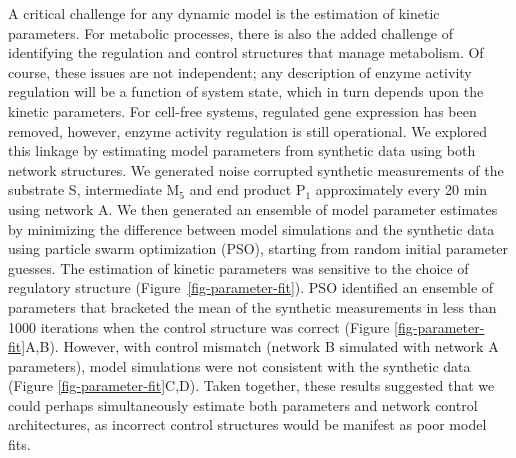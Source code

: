 \documentclass[processes,article,accept,moreauthors,pdftex,12pt,a4paper]{mdpi}
\begin{document}
A critical challenge for any dynamic model is the estimation of kinetic parameters. 
For metabolic processes, there is also the added challenge of identifying the regulation and control structures that manage metabolism. 
Of course, these issues are not independent; any description of enzyme activity regulation will be a function of system state, which in turn depends upon the kinetic parameters. 
For cell-free systems, regulated gene expression has been removed, however, enzyme activity regulation is still operational. 
We explored this linkage by estimating model parameters from synthetic data using both network structures. 
We generated noise corrupted synthetic measurements of the substrate S, intermediate M$_{5}$ and end product P$_1$ approximately every 20 min using
network A. We then generated an ensemble of model parameter estimates by minimizing the difference between model simulations and the synthetic data using particle swarm optimization (PSO), starting from random initial parameter guesses. The estimation of kinetic parameters was sensitive to the choice of regulatory structure (Figure~\ref{fig-parameter-fit}). 
PSO identified an ensemble of parameters that bracketed the mean of the synthetic measurements in less than 1000 iterations when the control structure was correct (Figure \ref{fig-parameter-fit}A,B). 
However, with control mismatch (network B simulated with network A parameters), model simulations were not consistent with the synthetic data  (Figure \ref{fig-parameter-fit}C,D). 
Taken together, these results suggested that we could perhaps simultaneously estimate both parameters and network control architectures, as incorrect control structures would be manifest as poor model fits.
\end{document}
